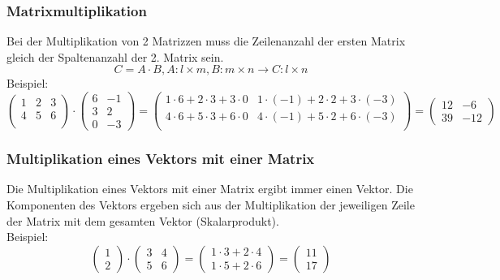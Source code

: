 \subsubsection{Matrixmultiplikation} 
\label{ssub:matrixmultiplikation}

Bei der Multiplikation von 2 Matrizzen muss die Zeilenanzahl der ersten Matrix gleich der Spaltenanzahl der 2. Matrix sein. 
\begin{equation}
	C = A \cdot B, A : l \times m, B : m \times n \rightarrow C : l \times n
\end{equation}
Beispiel: 
\begin{equation}
	\left(\begin{array}{ccc}1 & 2 & 3 \\4 & 5 & 6 \\\end{array}\right) \cdot
	\left(\begin{array}{cc}6 & -1 \\3 & 2 \\0 & -3\end{array}\right)
	=\left(\begin{array}{cc}1 \cdot 6  +  2 \cdot 3  +  3 \cdot 0 &
	  1 \cdot (-1) +  2 \cdot 2 +  3 \cdot (-3) \\4 \cdot 6  +  5 \cdot 3  +  6 \cdot 0 &
	  4 \cdot (-1) +  5 \cdot 2 +  6 \cdot (-3) \\\end{array}\right)
	=\left(\begin{array}{cc}12 & -6 \\39 & -12\end{array}\right)
\end{equation}

\subsubsection{Multiplikation eines Vektors mit einer Matrix}
\label{ssub:multiplikation_eines_vektors_mit_einer_matrix}

Die Multiplikation eines Vektors mit einer Matrix ergibt immer einen Vektor. Die Komponenten des Vektors ergeben sich
aus der Multiplikation der jeweiligen Zeile der Matrix mit dem gesamten Vektor (Skalarprodukt).
\\Beispiel:
\begin{equation}
	\left(\begin{array}{c}1\\2\end{array}\right) \cdot \left(\begin{array}{cc}3 & 4\\5 & 6\end{array}\right)
	= \left(\begin{array}{c}1 \cdot 3 + 2 \cdot 4 
	\\ 1 \cdot 5 + 2 \cdot 6 \end{array}\right) = \left(\begin{array}{c}11\\17\end{array}\right)
\end{equation}

